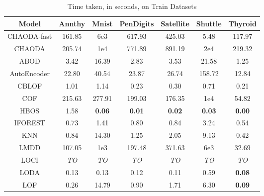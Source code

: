 \begin{table}[!t]
\renewcommand{\arraystretch}{1.25}
\caption{Time taken, in seconds, on Train Datasets}
\label{supplement:table:results:train-time}
\centering
\begin{tabular}{|c|c|c|c|c|c|c|}
\hline
\textbf{Model} & \textbf{Annthy} & \textbf{Mnist} & \textbf{PenDigits} & \textbf{Satellite} & \textbf{Shuttle} & \textbf{Thyroid} \\
\hline
CHAODA-fast &              161.85 &        6e3 &             617.93 &             425.03 &             5.48 &           117.97 \\
\hline
CHAODA &              205.74 &       1e4 &             771.89 &             891.19 &         2e4 &           219.32 \\
\hline
ABOD &                3.42 &          16.39 &               2.83 &               3.53 &            21.58 &             1.25 \\
\hline
AutoEncoder &               22.80 &          40.54 &              23.87 &              26.74 &           158.72 &            12.84 \\
\hline
CBLOF &                1.01 &           1.14 &               0.23 &               0.30 &             0.71 &             0.21 \\
\hline
COF &              215.63 &         277.91 &             199.03 &             176.35 &         1e4 &            54.82 \\
\hline
HBOS &                1.58 &  \textbf{0.06} &      \textbf{0.01} &      \textbf{0.02} &    \textbf{0.03} &    \textbf{0.00} \\
\hline
IFOREST &                0.73 &           1.41 &               0.80 &               0.84 &             3.24 &             0.54 \\
\hline
KNN &                0.84 &          14.30 &               1.25 &               2.05 &             9.13 &             0.42 \\
\hline
LMDD &              107.05 &        1e3 &             197.48 &             371.63 &          6e3 &            32.69 \\
\hline
LOCI &         \textit{TO} &    \textit{TO} &        \textit{TO} &        \textit{TO} &      \textit{TO} &      \textit{TO} \\
\hline
LODA &                0.13 &           0.13 &               0.12 &               0.11 &             0.59 &    \textbf{0.08} \\
\hline
LOF &                0.26 &          14.79 &               0.90 &               1.71 &             6.30 &    \textbf{0.09} \\

\end{tabular}
\end{table}
